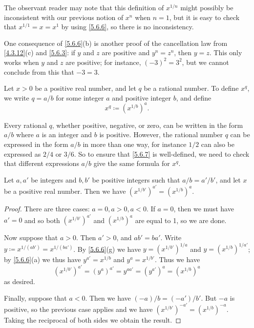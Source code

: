 \begin{note}
  The observant reader may note that this definition of \(x^{1 / n}\) might possibly be inconsistent with our previous notion of \(x^n\) when \(n = 1\), but it is easy to check that \(x^{1 / 1} = x = x^1\) by using \cref{5.6.6}, so there is no inconsistency.
\end{note}

\begin{note}
  One consequence of \cref{5.6.6}(b) is another proof of the cancellation law from \cref{4.3.12}(c) and \cref{5.6.3}:
  if \(y\) and \(z\) are positive and \(y^n = z^n\), then \(y = z\).
  This only works when \(y\) and \(z\) are positive;
  for instance, \((-3)^2 = 3^2\), but we cannot conclude from this that \(-3 = 3\).
\end{note}

\begin{defn}\label{5.6.7}
  Let \(x > 0\) be a positive real number, and let \(q\) be a rational number.
  To define \(x^q\), we write \(q = a / b\) for some integer \(a\) and positive integer \(b\), and define
  \[
    x^q \coloneqq (x^{1 / b})^a.
  \]
\end{defn}

\begin{note}
  Every rational \(q\), whether positive, negative, or zero, can be written in the form \(a / b\) where \(a\) is an integer and \(b\) is positive.
  However, the rational number \(q\) can be expressed in the form \(a / b\) in more than one way, for instance \(1 / 2\) can also be expressed as \(2 / 4\) or \(3 / 6\).
  So to ensure that \cref{5.6.7} is well-defined, we need to check that different expressions \(a / b\) give the same formula for \(x^q\).
\end{note}

\begin{lem}\label{5.6.8}
  Let \(a, a'\) be integers and \(b, b'\) be positive integers such that \(a / b = a' / b'\), and let \(x\) be a positive real number.
  Then we have \((x^{1 / b'})^{a'} = (x^{1 / b})^a\).
\end{lem}

\begin{proof}
  There are three cases: \(a = 0, a > 0, a < 0\).
  If \(a = 0\), then we must have \(a' = 0\) and so both \((x^{1 / b'})^{a'}\) and \((x^{1 / b})^a\) are equal to 1, so we are done.

  Now suppose that \(a > 0\).
  Then \(a' > 0\), and \(ab' = ba'\).
  Write \(y \coloneqq x^{1 / (ab')} = x^{1 / (ba')}\).
  By \cref{5.6.6}(g) we have \(y = (x^{1 / b'})^{1 / a}\) and \(y = (x^{1 / b})^{1 / a'}\);
  by \cref{5.6.6}(a) we thus have \(y^{a'} = x^{1 / b}\) and \(y^a = x^{1 / b'}\).
  Thus we have
  \[
    (x^{1 / b'})^{a'} = (y^a)^{a'} = y^{aa'} = (y^{a'})^a = (x^{1 / b})^a
  \]
  as desired.

  Finally, suppose that \(a < 0\).
  Then we have \((-a) / b = (-a') / b'\).
  But \(-a\) is positive, so the previous case applies and we have \((x^{1 / b'})^{-a'} = (x^{1 / b})^{-a}\).
  Taking the reciprocal of both sides we obtain the result.
\end{proof}

